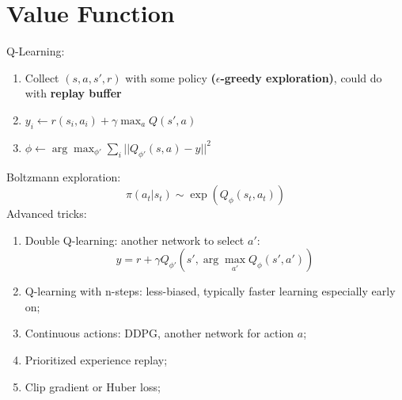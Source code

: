 \documentclass{article}
\begin{document}
\section{Value Function}
Q-Learning:
\begin{enumerate}
\item Collect $(s, a, s', r)$ with some policy \textbf{($\epsilon$-greedy exploration)}, could do with \textbf{replay buffer}
\item $y_i\leftarrow r(s_i, a_i)+\gamma\max_a Q(s',a)$
\item $\phi\leftarrow\arg\max_{\phi'}\sum_i||Q_{\phi'}(s,a)-y||^2$
\end{enumerate}
Boltzmann exploration:
\begin{equation*}
\pi(a_t|s_t)\sim\exp(Q_{\phi}(s_t, a_t))
\end{equation*}
Advanced tricks:
\begin{enumerate}
\item Double Q-learning: another network to select $a'$:
\begin{equation}
y = r + \gamma Q_{\phi'}(s', \arg\max_{a'}Q_{\phi}(s', a'))
\end{equation}
\item Q-learning with n-steps: less-biased, typically faster learning especially early on;
\item Continuous actions: DDPG, another network for action $a$;
\item Prioritized experience replay;
\item Clip gradient or Huber loss;
\end{enumerate}
\end{document}
